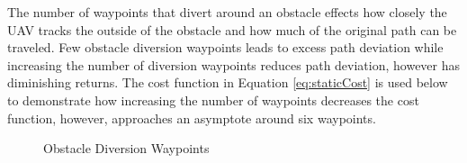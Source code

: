 \documentclass[numbered,pdftex]{ohio-etd}
\begin{document}
 The number of waypoints that divert around an obstacle effects how closely the UAV tracks the outside of the obstacle and how much of the original path can be traveled. Few obstacle diversion waypoints leads to excess path deviation while increasing the number of diversion waypoints reduces path deviation, however has diminishing returns. The cost function in Equation \ref{eq:staticCost} is used below to demonstrate how increasing the number of waypoints decreases the cost function, however, approaches an asymptote around six waypoints.


\begin{figure}[H]
	\begin{subfigmatrix}{2}%
		\centering	
		\hspace*{0mm}
	\end{subfigmatrix}
	\caption{Obstacle Diversion Waypoints}
	\label{fig:numWaypointsPath}
\end{figure}
\end{document}
